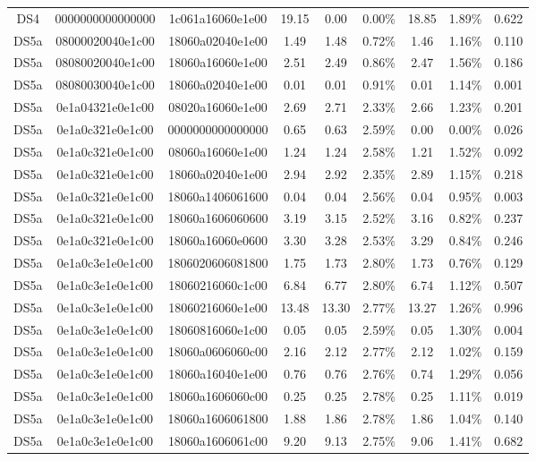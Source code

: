 \begin{tabular}{|c|c c|c|c c|c c|c|}
  DS4 & 0000000000000000 & 1c061a16060e1e00 & 19.15 & 0.00 & 0.00\% & 18.85 & 1.89\% & 0.622 \\
  DS5a & 08000020040e1c00 & 18060a02040e1e00 & 1.49 & 1.48 & 0.72\% & 1.46 & 1.16\% & 0.110 \\
  DS5a & 08080020040e1c00 & 18060a16060e1e00 & 2.51 & 2.49 & 0.86\% & 2.47 & 1.56\% & 0.186 \\
  DS5a & 08080030040e1c00 & 18060a02040e1e00 & 0.01 & 0.01 & 0.91\% & 0.01 & 1.14\% & 0.001 \\
  DS5a & 0e1a04321e0e1c00 & 08020a16060e1e00 & 2.69 & 2.71 & 2.33\% & 2.66 & 1.23\% & 0.201 \\
  DS5a & 0e1a0c321e0e1c00 & 0000000000000000 & 0.65 & 0.63 & 2.59\% & 0.00 & 0.00\% & 0.026 \\
  DS5a & 0e1a0c321e0e1c00 & 08060a16060e1e00 & 1.24 & 1.24 & 2.58\% & 1.21 & 1.52\% & 0.092 \\
  DS5a & 0e1a0c321e0e1c00 & 18060a02040e1e00 & 2.94 & 2.92 & 2.35\% & 2.89 & 1.15\% & 0.218 \\
  DS5a & 0e1a0c321e0e1c00 & 18060a1406061600 & 0.04 & 0.04 & 2.56\% & 0.04 & 0.95\% & 0.003 \\
  DS5a & 0e1a0c321e0e1c00 & 18060a1606060600 & 3.19 & 3.15 & 2.52\% & 3.16 & 0.82\% & 0.237 \\
  DS5a & 0e1a0c321e0e1c00 & 18060a16060e0600 & 3.30 & 3.28 & 2.53\% & 3.29 & 0.84\% & 0.246 \\
  DS5a & 0e1a0c3e1e0e1c00 & 1806020606081800 & 1.75 & 1.73 & 2.80\% & 1.73 & 0.76\% & 0.129 \\
  DS5a & 0e1a0c3e1e0e1c00 & 18060216060c1c00 & 6.84 & 6.77 & 2.80\% & 6.74 & 1.12\% & 0.507 \\
  DS5a & 0e1a0c3e1e0e1c00 & 18060216060e1e00 & 13.48 & 13.30 & 2.77\% & 13.27 & 1.26\% & 0.996 \\
  DS5a & 0e1a0c3e1e0e1c00 & 18060816060e1c00 & 0.05 & 0.05 & 2.59\% & 0.05 & 1.30\% & 0.004 \\
  DS5a & 0e1a0c3e1e0e1c00 & 18060a0606060c00 & 2.16 & 2.12 & 2.77\% & 2.12 & 1.02\% & 0.159 \\
  DS5a & 0e1a0c3e1e0e1c00 & 18060a16040e1e00 & 0.76 & 0.76 & 2.76\% & 0.74 & 1.29\% & 0.056 \\
  DS5a & 0e1a0c3e1e0e1c00 & 18060a1606060c00 & 0.25 & 0.25 & 2.78\% & 0.25 & 1.11\% & 0.019 \\
  DS5a & 0e1a0c3e1e0e1c00 & 18060a1606061800 & 1.88 & 1.86 & 2.78\% & 1.86 & 1.04\% & 0.140 \\
  DS5a & 0e1a0c3e1e0e1c00 & 18060a1606061c00 & 9.20 & 9.13 & 2.75\% & 9.06 & 1.41\% & 0.682 \\

\end{tabular}
